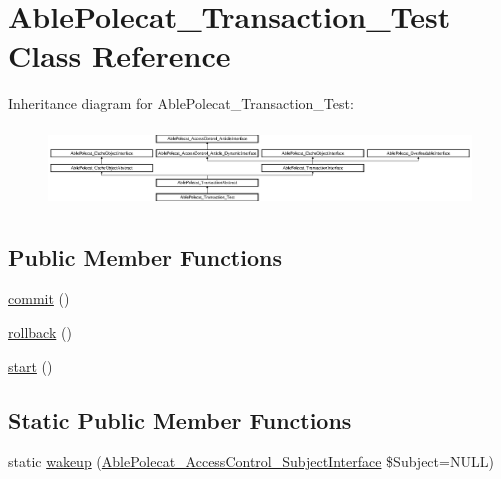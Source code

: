\hypertarget{class_able_polecat___transaction___test}{}\section{Able\+Polecat\+\_\+\+Transaction\+\_\+\+Test Class Reference}
\label{class_able_polecat___transaction___test}
Inheritance diagram for Able\+Polecat\+\_\+\+Transaction\+\_\+\+Test\+:\begin{figure}[H]
\begin{center}
\leavevmode
\includegraphics[height=2.134146cm]{class_able_polecat___transaction___test}
\end{center}
\end{figure}
\subsection*{Public Member Functions}
\begin{DoxyCompactItemize}
\item 
\hyperlink{class_able_polecat___transaction___test_af5674c27d4a92f6228565010eacbb9cb}{commit} ()
\item 
\hyperlink{class_able_polecat___transaction___test_afa549adf79e3f8c09fe8f903dd5fbfa7}{rollback} ()
\item 
\hyperlink{class_able_polecat___transaction___test_af8fa59992209e36dccb3eefb0f75531f}{start} ()
\end{DoxyCompactItemize}
\subsection*{Static Public Member Functions}
\begin{DoxyCompactItemize}
\item 
static \hyperlink{class_able_polecat___transaction___test_a3f2135f6ad45f51d075657f6d20db2cd}{wakeup} (\hyperlink{interface_able_polecat___access_control___subject_interface}{Able\+Polecat\+\_\+\+Access\+Control\+\_\+\+Subject\+Interface} \$Subject=N\+U\+L\+L)
\end{DoxyCompactItemize}
